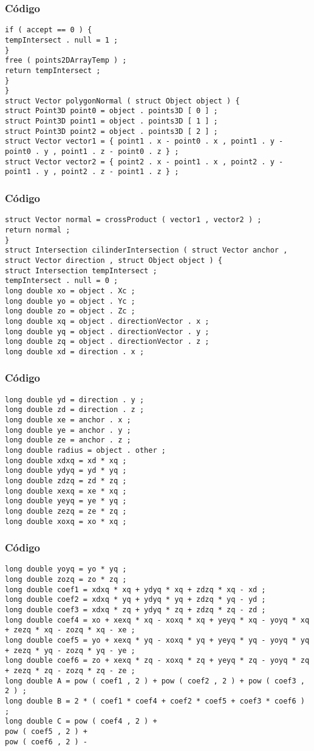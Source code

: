 \documentclass{beamer}
\begin{document}
\begin{frame}[fragile]
\frametitle{C\'odigo}
\begin{verbatim}
if ( accept == 0 ) { 
tempIntersect . null = 1 ; 
} 
free ( points2DArrayTemp ) ; 
return tempIntersect ; 
} 
} 
struct Vector polygonNormal ( struct Object object ) { 
struct Point3D point0 = object . points3D [ 0 ] ; 
struct Point3D point1 = object . points3D [ 1 ] ; 
struct Point3D point2 = object . points3D [ 2 ] ; 
struct Vector vector1 = { point1 . x - point0 . x , point1 . y - point0 . y , point1 . z - point0 . z } ; 
struct Vector vector2 = { point2 . x - point1 . x , point2 . y - point1 . y , point2 . z - point1 . z } ; 
\end{verbatim}
\end{frame}
\begin{frame}[fragile]
\frametitle{C\'odigo}
\begin{verbatim}
struct Vector normal = crossProduct ( vector1 , vector2 ) ; 
return normal ; 
} 
struct Intersection cilinderIntersection ( struct Vector anchor , struct Vector direction , struct Object object ) { 
struct Intersection tempIntersect ; 
tempIntersect . null = 0 ; 
long double xo = object . Xc ; 
long double yo = object . Yc ; 
long double zo = object . Zc ; 
long double xq = object . directionVector . x ; 
long double yq = object . directionVector . y ; 
long double zq = object . directionVector . z ; 
long double xd = direction . x ; 
\end{verbatim}
\end{frame}
\begin{frame}[fragile]
\frametitle{C\'odigo}
\begin{verbatim}
long double yd = direction . y ; 
long double zd = direction . z ; 
long double xe = anchor . x ; 
long double ye = anchor . y ; 
long double ze = anchor . z ; 
long double radius = object . other ; 
long double xdxq = xd * xq ; 
long double ydyq = yd * yq ; 
long double zdzq = zd * zq ; 
long double xexq = xe * xq ; 
long double yeyq = ye * yq ; 
long double zezq = ze * zq ; 
long double xoxq = xo * xq ; 
\end{verbatim}
\end{frame}
\begin{frame}[fragile]
\frametitle{C\'odigo}
\begin{verbatim}
long double yoyq = yo * yq ; 
long double zozq = zo * zq ; 
long double coef1 = xdxq * xq + ydyq * xq + zdzq * xq - xd ; 
long double coef2 = xdxq * yq + ydyq * yq + zdzq * yq - yd ; 
long double coef3 = xdxq * zq + ydyq * zq + zdzq * zq - zd ; 
long double coef4 = xo + xexq * xq - xoxq * xq + yeyq * xq - yoyq * xq + zezq * xq - zozq * xq - xe ; 
long double coef5 = yo + xexq * yq - xoxq * yq + yeyq * yq - yoyq * yq + zezq * yq - zozq * yq - ye ; 
long double coef6 = zo + xexq * zq - xoxq * zq + yeyq * zq - yoyq * zq + zezq * zq - zozq * zq - ze ; 
long double A = pow ( coef1 , 2 ) + pow ( coef2 , 2 ) + pow ( coef3 , 2 ) ; 
long double B = 2 * ( coef1 * coef4 + coef2 * coef5 + coef3 * coef6 ) ; 
long double C = pow ( coef4 , 2 ) + 
pow ( coef5 , 2 ) + 
pow ( coef6 , 2 ) - 
\end{verbatim}
\end{frame}
\end{document}
